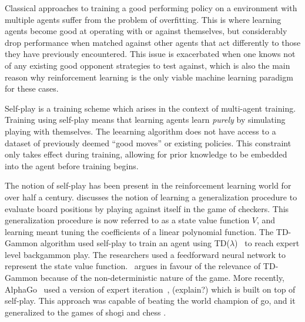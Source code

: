 \documentclass{../main.tex}{}
\begin{document}
Classical approaches to training a good performing policy on a environment with multiple agents suffer from the problem of overfitting. This is where learning agents become good at operating with or against themselves, but considerably drop performance when matched against other agents that act differently to those they have previously encountered. This issue is exacerbated when one knows not of any existing good opponent strategies to test against, which is also the main reason why reinforcement learning is the only viable machine learning paradigm for these cases.

Self-play is a training scheme which arises in the context of multi-agent training. Training using self-play means that learning agents learn \textit{purely} by simulating playing with themselves. The leearning algorithm does not have access to a dataset of previously deemed ``good moves'' or existing policies. This constraint only takes effect during training, allowing for prior knowledge to be embedded into the agent before training begins.

The notion of self-play has been present in the reinforcement learning world for over half a century. \citep{Samuel1959} discusses the notion of learning a generalization procedure to evaluate board positions by playing against itself in the game of checkers. This generalization procedure is now referred to as a state value function $V$, and learning meant tuning the coefficients of a linear polynomial function. The TD-Gammon algorithm \citep{TDGammon} used self-play to train an agent using TD($\lambda$)~\citep{Sutton1998} to reach expert level backgammon play. The researchers used a feedforward neural network to represent the state value function.~\citep{Tesauro1992} argues in favour of the relevance of TD-Gammon because of the non-deterministic nature of the game. More recently, AlphaGo~\citep{Silver2017a} used a version of expert iteration~\citep{Anthony2017}, (explain?) which is built on top of self-play.  This approach was capable of beating the world champion of go, and it generalized to the games of shogi and chess \citep{Silver2017b}. %
\end{document}
